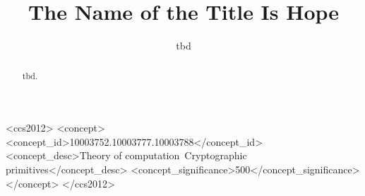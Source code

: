 \documentclass[sigconf]{acmart}
\begin{document}
\title{The Name of the Title Is Hope}

\author{tbd}

\renewcommand{\shortauthors}{tbd}

\begin{abstract}
  tbd. 
\end{abstract}

\begin{CCSXML}
  <ccs2012>
     <concept>
         <concept_id>10003752.10003777.10003788</concept_id>
         <concept_desc>Theory of computation~Cryptographic primitives</concept_desc>
         <concept_significance>500</concept_significance>
         </concept>
   </ccs2012>
\end{CCSXML}
  




\maketitle
\end{document}
